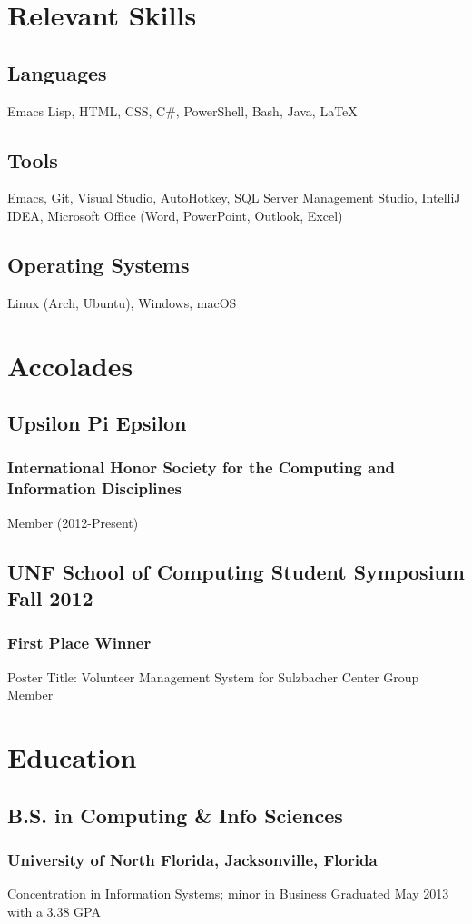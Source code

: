 \documentclass{article}
\begin{document}
\section{Relevant Skills}
\subsection{Languages}
Emacs Lisp, HTML, CSS, C\#, PowerShell, Bash, Java, {\LaTeX}

\subsection{Tools}
Emacs, Git, Visual Studio, AutoHotkey, SQL Server Management Studio, IntelliJ IDEA, Microsoft Office (Word, PowerPoint, Outlook, Excel)

\subsection{Operating Systems}
Linux (Arch, Ubuntu), Windows, macOS


\section{Accolades}
\subsection{Upsilon Pi Epsilon}
\subsubsection{International Honor Society for the Computing and Information Disciplines}
Member (2012-Present)

\subsection{UNF School of Computing Student Symposium Fall 2012}
\subsubsection{First Place Winner}
Poster Title: Volunteer Management System for Sulzbacher Center
Group Member

\section{Education}
\subsection{B.S. in Computing \& Info Sciences}
\subsubsection{University of North Florida, Jacksonville, Florida}
Concentration in Information Systems; minor in Business
Graduated May 2013 with a 3.38 GPA
\end{document}
